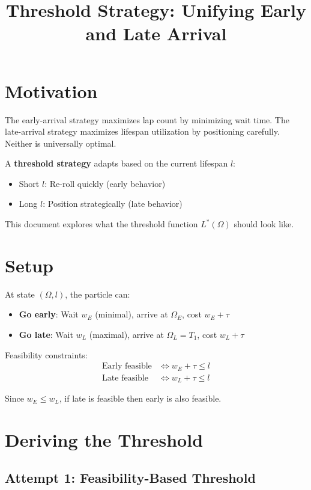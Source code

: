 \documentclass{article}
\title{Threshold Strategy: Unifying Early and Late Arrival}
\author{}
\date{}
\begin{document}
\maketitle

\section{Motivation}

The early-arrival strategy maximizes lap count by minimizing wait time. The late-arrival strategy maximizes lifespan utilization by positioning carefully. Neither is universally optimal.

A \textbf{threshold strategy} adapts based on the current lifespan $l$:
\begin{itemize}
    \item Short $l$: Re-roll quickly (early behavior)
    \item Long $l$: Position strategically (late behavior)
\end{itemize}

This document explores what the threshold function $L^*(\Omega)$ should look like.

\section{Setup}

At state $(\Omega, l)$, the particle can:
\begin{itemize}
    \item \textbf{Go early}: Wait $w_E$ (minimal), arrive at $\Omega_E$, cost $w_E + \tau$
    \item \textbf{Go late}: Wait $w_L$ (maximal), arrive at $\Omega_L = T_1$, cost $w_L + \tau$
\end{itemize}

Feasibility constraints:
\begin{align}
    \text{Early feasible} &\iff w_E + \tau \leq l \\
    \text{Late feasible} &\iff w_L + \tau \leq l
\end{align}

Since $w_E \leq w_L$, if late is feasible then early is also feasible.

\section{Deriving the Threshold}

\subsection{Attempt 1: Feasibility-Based Threshold}
\end{document}
